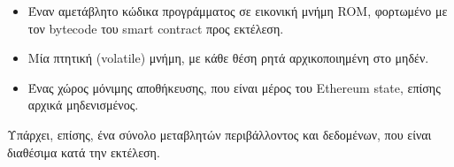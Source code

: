 \begin{itemize}
	\item Έναν αμετάβλητο κώδικα προγράμματος σε εικονική μνήμη ROM, φορτωμένο με τον \textenglish{bytecode} του smart contract προς εκτέλεση.
	\item Μία πτητική (volatile) μνήμη, με κάθε θέση ρητά αρχικοποιημένη στο μηδέν.
	\item Ένας χώρος μόνιμης αποθήκευσης, που είναι μέρος του Ethereum state, επίσης αρχικά μηδενισμένος.
\end{itemize}

Υπάρχει, επίσης, ένα σύνολο μεταβλητών περιβάλλοντος και δεδομένων, που είναι διαθέσιμα κατά την εκτέλεση.\cite{2.6-ethereum-mastering}

